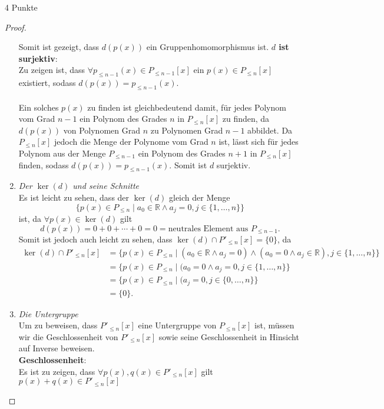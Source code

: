 \documentclass{problemset}
\begin{document}
\begin{problem}{4 Punkte}
\begin{proof}
\begin{enumerate}
              Somit ist gezeigt, dass $d(p(x))$ ein Gruppenhomomorphismus ist.
              \checkmark \textbf{$d$ ist surjektiv}: \\ Zu zeigen ist, dass
              $\forall p_{\le n-1}(x) \in P_{\le n-1}[x]$ ein $p(x) \in P_{\le
              n}[x]$ existiert, sodass $d(p(x)) = p_{\le n-1}(x)$. \\\\ Ein
              solches $p(x)$ zu finden ist gleichbedeutend damit, für jedes
              Polynom vom Grad $n-1$ ein Polynom des Grades $n$ in $P_{\le
              n}[x]$ zu finden, da $d(p(x))$ von Polynomen Grad $n$ zu
              Polynomen Grad $n-1$ abbildet. Da $P_{\le n}[x]$ jedoch die Menge
              der Polynome vom Grad $n$ ist, lässt sich für jedes Polynom aus
              der Menge $P_{\le n - 1}$ ein Polynom des Grades $n+1$ in $P_{\le
              n}[x]$ finden, sodass $d(p(x)) = p_{\le n -1}(x)$. Somit ist $d$
              surjektiv. \checkmark
        \item \textit{Der $\ker(d)$ und seine Schnitte} \\
              Es ist leicht zu sehen, dass der $\ker(d)$ gleich der Menge
              \[
                  \{p(x) \in P_{\le n} \mid a_0 \in \mathbb{R} \land a_j = 0, j \in \{1, \ldots, n\}\}
              \]
              ist, da $\forall p(x) \in \ker(d)$ gilt
              \[
                  d(p(x)) = 0 + 0 + \cdots + 0 = 0 = \text{neutrales Element aus } P_{\le n-1}.
              \]
              Somit ist jedoch auch leicht zu sehen, dass $\ker(d) \cap P'_{\le
              n}[x] = \{0\}$, da
              \begin{align}
                  \ker(d) \cap P'_{\le n}[x] & = \{p(x) \in P_{\le n} \mid (a_0 \in \mathbb{R} \land a_j = 0) \land (a_0 = 0 \land a_j \in \mathbb{R}), j \in \{1, \ldots, n\}\} \\
                                             & = \{p(x) \in P_{\le n} \mid (a_0 = 0 \land a_j = 0, j \in \{1, \ldots, n\}\}                                                      \\
                                             & = \{p(x) \in P_{\le n} \mid (a_j = 0, j \in \{0, \ldots, n\}\}                                                                    \\
                                             & = \{0\}.
              \end{align}
              \checkmark
        \item \textit{Die Untergruppe} \\
              Um zu beweisen, dass $P'_{\le n}[x]$ eine Untergruppe von $P_{\le n}[x]$ ist,
              müssen wir die Geschlossenheit von $P'_{\le n}[x]$ sowie seine Geschlossenheit
              in Hinsicht auf Inverse beweisen. \\ \textbf{Geschlossenheit}: \\ Es ist zu
              zeigen, dass $\forall p(x),q(x) \in P'_{\le n}[x]$ gilt $p(x) + q(x) \in
                  P'_{\le n}[x]$


\end{enumerate}
\end{proof}
\end{problem}
\end{document}
